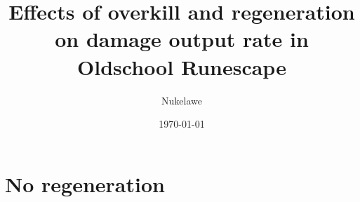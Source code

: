 

\title{Effects of overkill and regeneration on damage output rate in Oldschool Runescape}
\author{Nukelawe}
\date{\today}
\maketitle




\pagebreak
\section{No regeneration}\label{chap:noregen}






%
\pagebreak
\pagebreak


%


